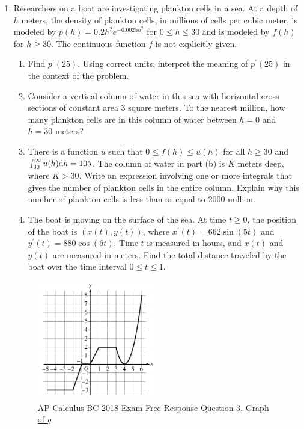 \begin{enumerate}
	\item Researchers on a boat are investigating plankton cells in a sea.
		At a depth of $h$ meters, the density of plankton cells, in millions of cells per cubic meter, is modeled by $p(h) = 0.2h^2e^{-0.0025h^2}$ for $0 \leq h \leq 30$ and is modeled by $f(h)$ for $h\geq 30$.
		The continuous function $f$ is not explicitly given.
		\begin{enumerate}
			\item Find $p^\prime(25)$.
				Using correct units, interpret the meaning of $p^\prime(25)$ in the context of the problem.
			\item Consider a vertical column of water in this sea with horizontal cross sections of constant area 3 square meters.
				To the nearest million, how many plankton cells are in this column of water between $h=0$ and $h=30$ meters?
			\item There is a function $u$ such that $0 \leq f(h) \leq u(h)$ for all $h \geq 30$ and $\int_{30}^{\infty}{u(h)\mathrm{d} h} = 105$.
				The column of water in part (b) is $K$ meters deep, where $K > 30$.
				Write an expression involving one or more integrals that gives the number of plankton cells in the entire column.
				Explain why this number of plankton cells is less than or equal to 2000 million.
			\item The boat is moving on the surface of the sea.
				At time $t \geq 0$, the position of the boat is $(x(t),y(t))$, where $x^\prime(t) = 662\sin{(5t)}$ and $y^\prime(t)=880\cos{(6t)}$.
				Time $t$ is measured in hours, and $x(t)$ and $y(t)$ are measured in meters.
				Find the total distance traveled by the boat over the time interval $0 \leq t \leq 1$.
		\end{enumerate}
	
		\begin{figure}[H]
			\label{2018_3}
			\centering
			\includegraphics[width=0.5\textwidth]{./additional_materials/2018_3.png}
			\caption{\hyperref{https://apcentral.collegeboard.org/pdf/ap18-frq-calculus-bc.pdf}{}{}{AP Calculus BC 2018 Exam Free-Response Question 3, Graph of $g$}}
		\end{figure}
	

\end{enumerate}
